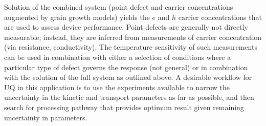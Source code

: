 \documentclass[11pt]{article}
\begin{document}


  Solution of the combined system (point defect and carrier
  concentrations augmented by grain growth models) yields the $e$ and
  $h$ carrier concentrations that are used to assess device
  performance. Point defects are generally not directly measurable;
  instead, they are inferred from measurements of carrier
  concentration (via resistance, conductivity). The temperature
  sensitivity of such measurements can be used in combination with
  either a selection of conditions where a particular type of defect
  governs the response (not general) or in combination with the
  solution of the full system as outlined above. A desirable workflow
  for UQ in this application is to use the experiments available to narrow
  the uncertainty in the kinetic and transport parameters as far as
  possible, and then search for processing pathway that provides
  optimum result given remaining uncertainty in parameters.


\end{document}
